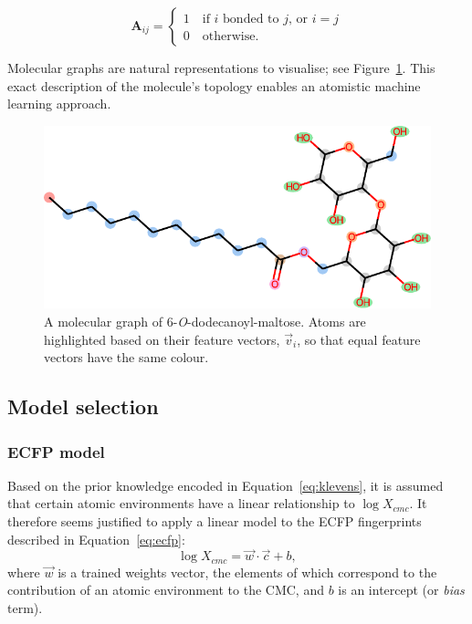 \begin{equation}
    \label{eq:adjacency-mat}
    \mathbf{A}_{ij} = \begin{cases}
        1 \quad \text{if } i \text { bonded to } j \text{, or } i = j \\
        0 \quad \text{otherwise.}
    \end{cases}
\end{equation}

Molecular graphs are natural representations to visualise; see
Figure~\ref{fig:mol-graph}. This exact description of the molecule's topology
enables an atomistic machine learning approach.

\begin{figure}
    \centering
    \includegraphics[width=.8\linewidth]{images/molecular-graph.pdf}
    \caption{A molecular graph of 6-\textit{O}-dodecanoyl-maltose. Atoms are
        highlighted based on their feature vectors, $\vec{v}_i$, so that equal
        feature vectors have the same colour.}
    \label{fig:mol-graph}
\end{figure}

\subsection{Model selection}

\subsubsection{ECFP model}

Based on the prior knowledge encoded in Equation~\ref{eq:klevens}, it is
assumed that certain atomic environments have a linear relationship to $\log X_{cmc}$. It therefore seems justified to apply a linear model to the ECFP fingerprints described in Equation~\ref{eq:ecfp}:
\begin{equation}
    \label{eq:linear-ecfp}
    \log X_{cmc} = \vec{w} \cdot \vec{c} + b,
\end{equation}
where $\vec{w}$ is a trained weights vector, the elements of which correspond to the contribution of an atomic environment to the CMC, and $b$ is an intercept (or \emph{bias} term).

